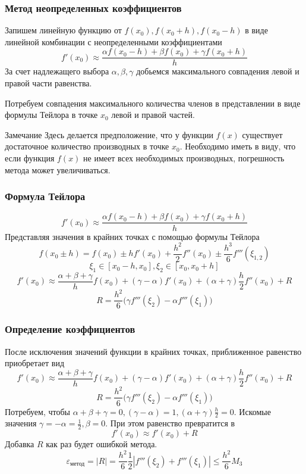 \documentclass[aspectratio=169,unicode]{beamer}
\begin{document}
\begin{frame}
\frametitle{Метод неопределенных коэффициентов}
	Запишем линейную функцию от $f(x_0), f(x_0+h), f(x_0-h)$ в виде линейной комбинации с неопределенными коэффициентами
	\[
	f'(x_0) \approx \frac{\alpha f(x_0-h)  + \beta f(x_0) + \gamma f(x_0+h)}{h}
	\]
	За счет надлежащего выбора $\alpha, \beta, \gamma$ добьемся максимального совпадения левой и правой части равенства.

	\pause
	Потребуем совпадения максимального количества членов в представлении в виде формулы Тейлора в точке $x_0$ левой и правой частей.
	\begin{block}{Замечание}
	Здесь делается предположение, что у функции $f(x)$ существует достаточное количество производных в точке $x_0$.
	Необходимо иметь в виду, что если функция $f(x)$ не имеет всех необходимых производных, погрешность метода может увеличиваться.
	\end{block}
\end{frame}

\begin{frame}
\frametitle{Формула Тейлора}
	\[
	f'(x_0) \approx \frac{\alpha f(x_0-h)  + \beta f(x_0) + \gamma f(x_0+h)}{h}
	\]
	Представляя значения в крайних точках с помощью формулы Тейлора
	\[
	f(x_0 \pm h) = f(x_0) \pm h f'(x_0) + \frac{h^2}{2} f''(x_0) \pm \frac{h^3}{6} f'''(\xi_{1,2})
	\]
	\[
	\xi_1 \in [x_0-h, x_0],\xi_2 \in [x_0, x_0+h]
	\]
	\[
	f'(x_0) \approx \frac{\alpha + \beta + \gamma}{h} f(x_0) + (\gamma - \alpha) f'(x_0) + (\alpha+\gamma) \frac{h}{2}f''(x_0) + R
	\]
	\[
	R = \frac{h^2}{6}\Big(\gamma f'''(\xi_2) - \alpha f'''(\xi_1)\Big)
	\]
\end{frame}

\begin{frame}
\frametitle{Определение коэффициентов}
	После исключения значений функции в крайних точках, приближенное равенство приобретает вид
	\[
	f'(x_0) \approx \frac{\alpha + \beta + \gamma}{h} f(x_0) + (\gamma - \alpha) f'(x_0) + (\alpha+\gamma) \frac{h}{2}f''(x_0) + R
	\]
	\[
	R = \frac{h^2}{6}\Big(\gamma f'''(\xi_2) - \alpha f'''(\xi_1)\Big)
	\]
	Потребуем, чтобы $\alpha + \beta + \gamma = 0, (\gamma - \alpha) = 1, (\alpha+\gamma) \frac{h}{2} = 0$.
	Искомые значения $\gamma = -\alpha = \frac{1}{2}, \beta = 0$.
	При этом равенство превратится в
	\[
	f'(x_0) \approx f'(x_0) + R
	\]
	Добавка $R$ как раз будет ошибкой метода.
	\[
	\varepsilon_{\text{метод}} = |R| = \frac{h^2}{6} \frac{1}{2}|f'''(\xi_2) + f'''(\xi_1)| \leqslant \frac{h^2}{6} M_3
	\]
\end{frame}
\end{document}
